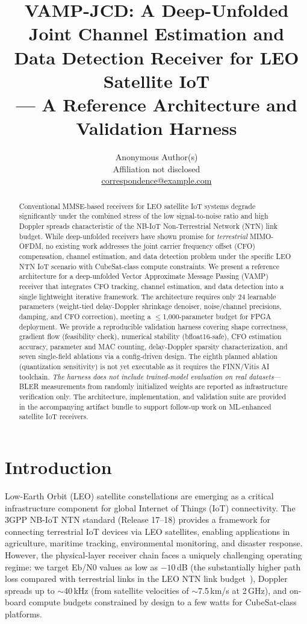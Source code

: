 \documentclass{article}
\title{VAMP-JCD: A Deep-Unfolded Joint Channel Estimation and\\Data Detection Receiver for LEO Satellite IoT\\
--- A Reference Architecture and Validation Harness}
\author{Anonymous Author(s)\\
Affiliation not disclosed\\
\href{mailto:correspondence@example.com}{correspondence@example.com}}
\begin{document}
\maketitle

\begin{abstract}
Conventional MMSE-based receivers for LEO satellite IoT systems degrade significantly under the combined stress of the low signal-to-noise ratio and high Doppler spreads characteristic of the NB-IoT Non-Terrestrial Network (NTN) link budget. While deep-unfolded receivers have shown promise for \emph{terrestrial} MIMO-OFDM, no existing work addresses the joint carrier frequency offset (CFO) compensation, channel estimation, and data detection problem under the specific LEO NTN IoT scenario with CubeSat-class compute constraints. We present a reference architecture for a deep-unfolded Vector Approximate Message Passing (VAMP) receiver that integrates CFO tracking, channel estimation, and data detection into a single lightweight iterative framework. The architecture requires only 24 learnable parameters (weight-tied delay-Doppler shrinkage denoiser, noise/channel precisions, damping, and CFO correction), meeting a $\leq$1,000-parameter budget for FPGA deployment. We provide a reproducible validation harness covering shape correctness, gradient flow (feasibility check), numerical stability (bfloat16-safe), CFO estimation accuracy, parameter and MAC counting, delay-Doppler sparsity characterization, and seven single-field ablations via a config-driven design. The eighth planned ablation (quantization sensitivity) is not yet executable as it requires the FINN/Vitis AI toolchain. \emph{The harness does not include trained-model evaluation on real datasets}---BLER measurements from randomly initialized weights are reported as infrastructure verification only. The architecture, implementation, and validation suite are provided in the accompanying artifact bundle to support follow-up work on ML-enhanced satellite IoT receivers.
\end{abstract}

\section{Introduction}
\label{sec:introduction}

Low-Earth Orbit (LEO) satellite constellations are emerging as a critical infrastructure component for global Internet of Things (IoT) connectivity. The 3GPP NB-IoT NTN standard (Release 17--18) provides a framework for connecting terrestrial IoT devices via LEO satellites, enabling applications in agriculture, maritime tracking, environmental monitoring, and disaster response. However, the physical-layer receiver chain faces a uniquely challenging operating regime: we target Eb/N0 values as low as $-10$\,dB (the substantially higher path loss compared with terrestrial links in the LEO NTN link budget~\cite{3gppTR38811}), Doppler spreads up to $\sim$40\,kHz (from satellite velocities of $\sim$7.5\,km/s at 2\,GHz), and on-board compute budgets constrained by design to a few watts for CubeSat-class platforms.
\end{document}
